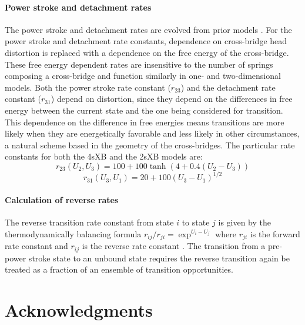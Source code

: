 \documentclass[10pt]{article}
\newcommand{\citep}[1]{\cite{#1}} %
\begin{document}
\paragraph{Power stroke and detachment rates} %
The power stroke and detachment rates are evolved from prior models \citep{Pate1989, Tanner2007}. 
For the power stroke and detachment rate constants, dependence on cross-bridge head distortion is replaced with a dependence on the free energy of the cross-bridge.
These free energy dependent rates are insensitive to the number of springs composing a cross-bridge and function similarly in one- and two-dimensional models. 
Both the power stroke rate constant ($r_{23}$) and the detachment rate constant ($r_{31}$) depend on distortion, since they depend on the differences in free energy between the current state and the one being considered for transition.  
This dependence on the difference in free energies means transitions are more likely when they are energetically favorable and less likely in other circumstances, a natural scheme based in the geometry of the cross-bridges.
The particular rate constants for both the 4sXB and the 2sXB models are: 
$$r_{23}(U_2, U_3) = 100 + 100\tanh(4 + 0.4 (U_2 - U_3)) $$
$$r_{31}(U_3, U_1) = 20 + 100 (U_3 - U_1)^{1/2} $$

\paragraph{Calculation of reverse rates} %
The reverse transition rate constant from state $i$ to state $j$ is given by the thermodynamically balancing formula $r_{ij}/r_{ji}=\exp^{U_i-U_j}$ where $r_{ji}$ is the forward rate constant and $r_{ij}$ is the reverse rate constant \citep{Pate1989, Daniel1998, Tanner2007}.
The transition from a pre-power stroke state to an unbound state requires the reverse transition again be treated as a fraction of an ensemble of transition opportunities. 



\section*{Acknowledgments} %



\clearpage

\end{document}
